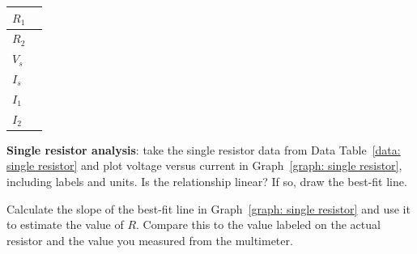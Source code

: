 \documentclass[addpoints]{physlabs}
\begin{document}
\begin{postlab}
    \begin{center}
        \captionsetup{font=normalsize}
        \renewcommand{\arraystretch}{1.5}
        \begin{tabular}{|>{\centering\arraybackslash}p{3cm}|>{\centering\arraybackslash}p{3cm}|}
            \hline
            $R_1$ & \\ \hline
            $R_2$ & \\ \hline
            $V_s$ & \\ \hline
            $I_s$ & \\ \hline
            $I_1$ & \\ \hline
            $I_2$ & \\ \hline
        \end{tabular}
    \end{center}

    \filbreak
    \question[2] \textbf{Single resistor analysis}: take the single resistor data from Data Table~\ref{data: single resistor} and plot voltage versus current in Graph~\ref{graph: single resistor}, including labels and units. Is the relationship linear? If so, draw the best-fit line.

    \begin{center}
    \captionsetup{font=normalsize}
    \end{center}

    \filbreak
    \question[1] Calculate the slope of the best-fit line in Graph~\ref{graph: single resistor} and use it to estimate the value of $R$. Compare this to the value labeled on the actual resistor and the value you measured from the multimeter.
    \begin{solution}[3cm]
        

\end{solution}
\end{postlab}
\end{document}
